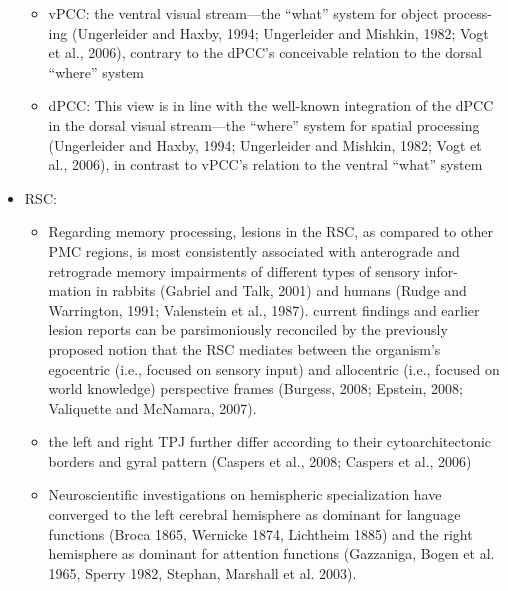 \documentclass{article} %
\begin{document}
\begin{itemize}
\begin{itemize}
  \item
    vPCC:
the ventral visual stream—the “what” system for object process- ing (Ungerleider and Haxby, 1994; Ungerleider and Mishkin, 1982; Vogt et al., 2006), contrary to the dPCC's conceivable relation to the dorsal “where” system
\item
  dPCC:
This view is in line with the well-known integration of the dPCC in the dorsal visual stream—the “where” system for spatial processing (Ungerleider and Haxby, 1994; Ungerleider and Mishkin, 1982; Vogt et al., 2006), in contrast to vPCC's relation to the ventral “what” system
\end{itemize}



\item RSC:
  \begin{itemize}
\item
Regarding memory processing, lesions in the RSC, as compared to other PMC regions, is most consistently associated with anterograde and retrograde memory impairments of different types of sensory infor- mation in rabbits (Gabriel and Talk, 2001) and humans (Rudge and Warrington, 1991; Valenstein et al., 1987).
current findings and earlier lesion reports can be parsimoniously reconciled by the previously proposed notion that the RSC mediates between the organism's egocentric (i.e., focused on sensory input) and allocentric (i.e., focused on world knowledge) perspective frames (Burgess, 2008; Epstein, 2008; Valiquette and McNamara, 2007).

\item
the left and right TPJ further differ according to their cytoarchitectonic borders and gyral pattern (Caspers et al., 2008; Caspers et al., 2006)

\item
Neuroscientific investigations on hemispheric specialization have converged to the left cerebral hemisphere as dominant for language functions (Broca 1865, Wernicke 1874, Lichtheim 1885) and the right hemisphere as dominant for attention functions (Gazzaniga, Bogen et al. 1965, Sperry 1982, Stephan, Marshall et al. 2003). 
  \end{itemize}



\end{itemize}
\end{document}
